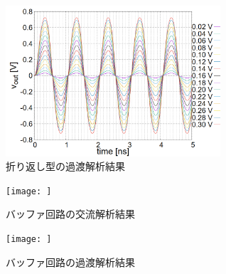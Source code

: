 \documentclass[twocolumn]{jsarticle}
\begin{document}
    \begin{figure}[H]
        \begin{center}
            \includegraphics*[width = 80mm]{figures/NtoN_tr.PNG}
            \caption{折り返し型の過渡解析結果}
            \label{fig:sim_NtoN_tr}
        \end{center}
    \end{figure}
    \begin{figure}[H]
        \begin{center}
            \texttt{[image: ]}
            \caption{バッファ回路の交流解析結果}
            \label{fig:sim_buf_ac}
        \end{center}
    \end{figure}
    \begin{figure}[H]
        \begin{center}
            \texttt{[image: ]}
            \caption{バッファ回路の過渡解析結果}
            \label{fig:sim_buf_tr}
        \end{center}
    \end{figure}
\end{document}
